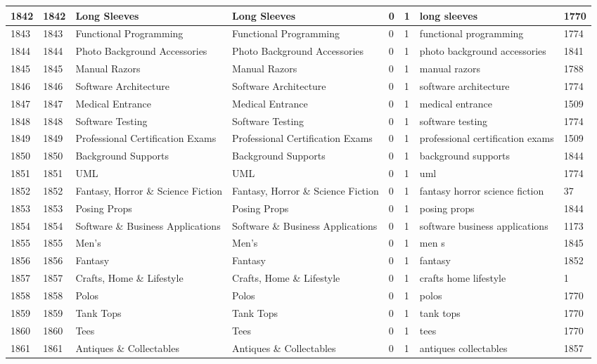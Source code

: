 \begin{longtable}{|l|l|l|l|l|l|l|l|}
1842 & 1842 & Long Sleeves & Long Sleeves & 0 & 1 & long sleeves & 1770 \\ \hline 
1843 & 1843 & Functional Programming & Functional Programming & 0 & 1 & functional programming & 1774 \\ \hline 
1844 & 1844 & Photo Background Accessories & Photo Background Accessories & 0 & 1 & photo background accessories & 1841 \\ \hline 
1845 & 1845 & Manual Razors & Manual Razors & 0 & 1 & manual razors & 1788 \\ \hline 
1846 & 1846 & Software Architecture & Software Architecture & 0 & 1 & software architecture & 1774 \\ \hline 
1847 & 1847 & Medical Entrance & Medical Entrance & 0 & 1 & medical entrance & 1509 \\ \hline 
1848 & 1848 & Software Testing & Software Testing & 0 & 1 & software testing & 1774 \\ \hline 
1849 & 1849 & Professional Certification Exams & Professional Certification Exams & 0 & 1 & professional certification exams & 1509 \\ \hline 
1850 & 1850 & Background Supports & Background Supports & 0 & 1 & background supports & 1844 \\ \hline 
1851 & 1851 & UML & UML & 0 & 1 & uml & 1774 \\ \hline 
1852 & 1852 & Fantasy, Horror \& Science Fiction & Fantasy, Horror \& Science Fiction & 0 & 1 & fantasy horror science fiction & 37 \\ \hline 
1853 & 1853 & Posing Props & Posing Props & 0 & 1 & posing props & 1844 \\ \hline 
1854 & 1854 & Software \& Business Applications & Software \& Business Applications & 0 & 1 & software business applications & 1173 \\ \hline 
1855 & 1855 & Men's & Men's & 0 & 1 & men s & 1845 \\ \hline 
1856 & 1856 & Fantasy & Fantasy & 0 & 1 & fantasy & 1852 \\ \hline 
1857 & 1857 & Crafts, Home \& Lifestyle & Crafts, Home \& Lifestyle & 0 & 1 & crafts home lifestyle & 1 \\ \hline 
1858 & 1858 & Polos & Polos & 0 & 1 & polos & 1770 \\ \hline 
1859 & 1859 & Tank Tops & Tank Tops & 0 & 1 & tank tops & 1770 \\ \hline 
1860 & 1860 & Tees & Tees & 0 & 1 & tees & 1770 \\ \hline 
1861 & 1861 & Antiques \& Collectables & Antiques \& Collectables & 0 & 1 & antiques collectables & 1857 \\ \hline 

\end{longtable}
